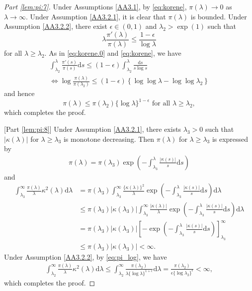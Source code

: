 \documentclass[preprint,11pt]{imsart}
\numberwithin{equation}{section}
\theoremstyle{plain}
\theoremstyle{definition}
\theoremstyle{remark}
\newcommand{\rd}{\mathrm{d}}
\begin{document}
\begin{proof}
[Part \ref{lem:pi:7}] 
  Under Assumptions \ref{AA3.1},
  by \eqref{eq:korene}, $\pi(\lambda)\to 0$ as $\lambda\to \infty$.
 Under Assumption \ref{AA3.2.1}, it is clear that $\pi(\lambda)$ is bounded.
  Under Assumption \ref{AA3.2.2}, there exist $\epsilon\in(0,1)$ and
  $\lambda_2>\exp(1)$ such that
\begin{equation}\label{eq:pi_log.0}
 \lambda\frac{\pi'(\lambda)}{\pi(\lambda)}\leq \frac{1-\epsilon}{\log \lambda}
\end{equation}
  for all $\lambda\geq \lambda_2$. 
As in \eqref{eq:korene.0} and \eqref{eq:korene}, we have
\begin{gather*}
 \int_{\lambda_2}^\lambda \frac{\pi'(s)}{\pi(s)}\rd s\leq 
(1-\epsilon)\int_{\lambda_2}^\lambda\frac{\rd s}{s\log s} \\
 \Leftrightarrow \log \frac{\pi(\lambda)}{\pi(\lambda_2)}
 \leq (1-\epsilon)\left\{\log\log \lambda-\log\log \lambda_2\right\}
\end{gather*}
  and hence
  \begin{equation}\label{eq:pi_log}
\pi(\lambda)\leq \pi(\lambda_2)\{\log \lambda\}^{1-\epsilon}\text{ for all }\lambda\geq \lambda_2,
  \end{equation}
  which completes the proof.
  
  [Part \ref{lem:pi:8}] 
  Under Assumption \ref{AA3.2.1}, there exists $\lambda_3>0$ such that
  $|\kappa(\lambda)|$ for $\lambda\geq \lambda_3$ is monotone decreasing. 
Then  $\pi(\lambda)$ for $\lambda\geq \lambda_3$ is expressed by
  \begin{align*}
   \pi(\lambda)=\pi(\lambda_3)\exp\left(-\int_{\lambda_3}^\lambda \frac{|\kappa(s)|}{s}\rd s\right)
  \end{align*}
  and
  \begin{align*}
 \int_{\lambda_3}^\infty
 \frac{\pi(\lambda)}{\lambda}\kappa^2(\lambda)\rd \lambda 
 &=\pi(\lambda_3) \int_{\lambda_3}^\infty \frac{\{\kappa(\lambda)\}^2}{\lambda}
 \exp\left(-\int_{\lambda_3}^\lambda \frac{|\kappa(s)|}{s}\rd s\right)\rd \lambda \\
 &\leq \pi(\lambda_3)|\kappa(\lambda_3)| \int_{\lambda_3}^\infty \frac{|\kappa(\lambda)|}{\lambda}
 \exp\left(-\int_{\lambda_3}^\lambda \frac{|\kappa(s)|}{s}\rd s\right)\rd \lambda \\
 &= \pi(\lambda_3)|\kappa(\lambda_3)|
\left[-\exp\left(-\int_{\lambda_3}^\lambda \frac{|\kappa(s)|}{s}\rd s\right)\right]_{\lambda_3}^\infty \\
 &\leq \pi(\lambda_3)|\kappa(\lambda_3)|<\infty.
  \end{align*}
  Under Assumption \ref{AA3.2.2}, by \eqref{eq:pi_log}, we have
  \begin{align*}
 \int_{\lambda_2}^\infty
 \frac{\pi(\lambda)}{\lambda}\kappa^2(\lambda)\rd \lambda 
\leq 
   \int_{\lambda_2}^\infty \frac{\pi(\lambda_2)}{\lambda \{\log \lambda\}^{1+\epsilon}}\rd \lambda 
=\frac{\pi(\lambda_2)}{\epsilon\{\log \lambda_2\}^{\epsilon}}<\infty,
  \end{align*}
which completes the proof.
 \end{proof}
\end{document}
